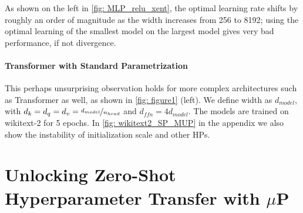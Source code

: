 \documentclass{article}
\theoremstyle{definition}
\begin{document}
As shown on the left in \cref{fig: MLP_relu_xent}, the optimal learning rate shifts by roughly an order of magnitude as the width increases from 256 to 8192; using the optimal learning of the smallest model on the largest model gives very bad performance, if not divergence.

\paragraph{Transformer with Standard Parametrization}
This perhaps unsurprising observation holds for more complex architectures such as Transformer as well, as shown in \cref{fig: figure1} (left).
We define width as $d_{model}$, with $d_{k}=d_{q}=d_{v}=\nicefrac{d_{model}}{n_{head}}$ and $d_{ffn}=4  d_{model}$.
The models are trained on wikitext-2 for 5 epochs.
In \cref{fig: wikitext2_SP_MUP} in the appendix we also show the instability of initialization scale and other HPs.

\section{Unlocking Zero-Shot Hyperparameter Transfer with \texorpdfstring{$\mu$P}{muP}}
\label{sec:mutransfer}
\end{document}
